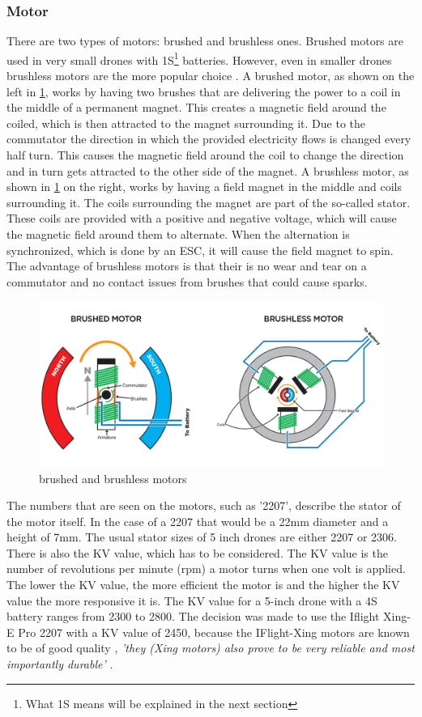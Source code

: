 \documentclass[svgnames]{article}
\begin{document}
	\subsubsection{Motor}
	There are two types of motors: brushed and brushless ones. Brushed motors are used in very small drones with 1S\footnote{What 1S means will be explained in the next section} batteries. However, even in smaller drones brushless motors are the more popular choice \cite{brush/lessmotors}. A brushed motor, as shown on the left in \cref{fig:brushedbrushlessmotor}, works by having two brushes that are delivering the power to a coil in the middle of a permanent magnet. This creates a magnetic field around the coiled, which is then attracted to the magnet surrounding it. Due to the commutator the direction in which the provided electricity flows is changed every half turn. This causes the magnetic field around the coil to change the direction and in turn gets attracted to the other side of the magnet. A brushless motor, as shown in \cref{fig:brushedbrushlessmotor} on the right, works by having a field magnet in the middle and coils surrounding it. The coils surrounding the magnet are part of the so-called stator. These coils are provided with a positive and negative voltage, which will cause the magnetic field around them to alternate. When the alternation is synchronized, which is done by an \gls{ESC}, it will cause the field magnet to spin. The advantage of brushless motors is that their is no wear and tear on a commutator and no contact issues from brushes that could cause sparks.
\begin{figure}[ht]
	\includegraphics[width=0.9\columnwidth]{pictures/brushed_brushlessmotor}
	\caption{brushed and brushless motors \cite{brushlessedmotor}}
	\label{fig:brushedbrushlessmotor}
\end{figure}

	The numbers that are seen on the motors, such as '2207', describe the stator of the motor itself. In the case of a 2207 that would be a 22mm diameter and a height of 7mm. The usual stator sizes of 5 inch drones are either 2207 or 2306. There is also the KV value, which has to be considered. The KV value is the number of revolutions per minute (rpm) a motor turns when one volt is applied. The lower the KV value, the more efficient the motor is and the higher the KV value the more responsive it is. The KV value for a 5-inch drone with a 4S battery ranges from 2300 to 2800. The decision was made to use the Iflight Xing-E Pro 2207  with a KV value of 2450, because the IFlight-Xing motors are known to be of good quality \cite{xingepro}, \textit{'they (Xing motors) also prove to be very reliable and most importantly durable'} \textcite{xingreview}. 
\end{document}
